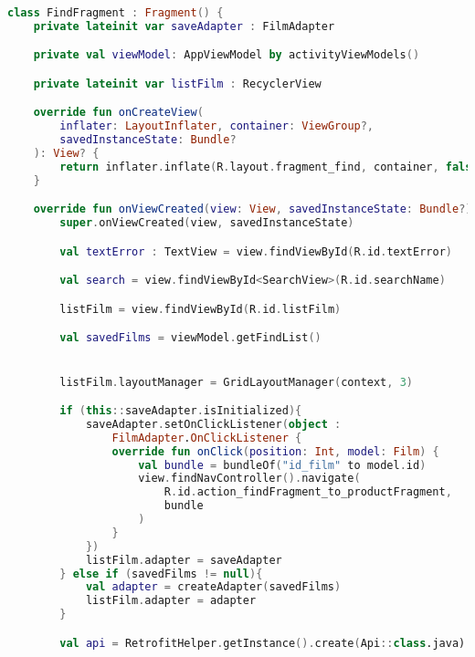 \begin{lstlisting}[language=Kotlin, caption=\leftline{FindFragment}, label=lst:FindFragment]
class FindFragment : Fragment() {
    private lateinit var saveAdapter : FilmAdapter

    private val viewModel: AppViewModel by activityViewModels()

    private lateinit var listFilm : RecyclerView

    override fun onCreateView(
        inflater: LayoutInflater, container: ViewGroup?,
        savedInstanceState: Bundle?
    ): View? {
        return inflater.inflate(R.layout.fragment_find, container, false)
    }

    override fun onViewCreated(view: View, savedInstanceState: Bundle?) {
        super.onViewCreated(view, savedInstanceState)

        val textError : TextView = view.findViewById(R.id.textError)

        val search = view.findViewById<SearchView>(R.id.searchName)

        listFilm = view.findViewById(R.id.listFilm)

        val savedFilms = viewModel.getFindList()


        listFilm.layoutManager = GridLayoutManager(context, 3)

        if (this::saveAdapter.isInitialized){
            saveAdapter.setOnClickListener(object :
                FilmAdapter.OnClickListener {
                override fun onClick(position: Int, model: Film) {
                    val bundle = bundleOf("id_film" to model.id)
                    view.findNavController().navigate(
                        R.id.action_findFragment_to_productFragment,
                        bundle
                    )
                }
            })
            listFilm.adapter = saveAdapter
        } else if (savedFilms != null){
            val adapter = createAdapter(savedFilms)
            listFilm.adapter = adapter
        }

        val api = RetrofitHelper.getInstance().create(Api::class.java)


\end{lstlisting}

